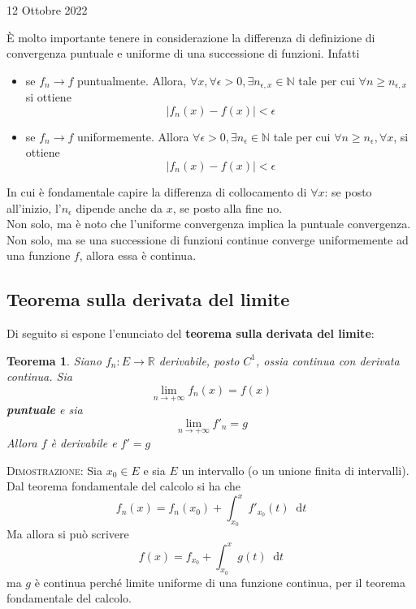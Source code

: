 \documentclass[a4paper]{extarticle}
\newtheorem{theorem}{Teorema}[section]
\newcommand*\dif{\mathop{}\!\mathrm{d}}
\begin{document}
\newpage
\noindent
\begin{center}
    12 Ottobre 2022
\end{center}
È molto importante tenere in considerazione la differenza di definizione di convergenza puntuale e uniforme di una successione di funzioni. Infatti
\begin{itemize}
    \item se $f_n \to f$ puntualmente. Allora, $\forall x, \forall \epsilon > 0, \exists n_{\epsilon,x} \in \mathbb{N}$ tale per cui $\forall n \geq n_{\epsilon,x}$ si ottiene
    \[\left \vert f_n(x) - f(x) \right \vert < \epsilon\]

    \item se $f_n \to f$ uniformemente. Allora $\forall \epsilon > 0, \exists n_\epsilon \in \mathbb{N}$ tale per cui $\forall n \geq n_\epsilon, \forall x$, si ottiene
    \[\left \vert f_n(x) - f(x) \right \vert < \epsilon\]
\end{itemize}
In cui è fondamentale capire la differenza di collocamento di $\forall x$: se posto all'inizio, l'$n_\epsilon$ dipende anche da $x$, se posto alla fine no.\\
Non solo, ma è noto che l'uniforme convergenza implica la puntuale convergenza. Non solo, ma se una successione di funzioni continue converge uniformemente ad una funzione $f$, allora essa è continua.

\vspace{1em}
\subsection{Teorema sulla derivata del limite}
Di seguito si espone l'enunciato del \textbf{teorema sulla derivata del limite}:

\begin{theorem}
    Siano $f_n : E \to \mathbb{R}$ derivabile, posto $C^1$, ossia continua con derivata continua. Sia
    \[\lim_{n \to +\infty} f_n(x) = f(x)\]
    \textbf{puntuale} e sia
    \[\lim_{n \to +\infty} f'_n = g\]
    Allora $f$ è derivabile e $f'=g$
\end{theorem}

\vspace{2em}
\noindent
\normalfont \normalsize
\textsc{Dimostrazione}: Sia $x_0 \in E$ e sia $E$ un intervallo (o un unione finita di intervalli). Dal teorema fondamentale del calcolo si ha che
\[f_n(x) = f_n(x_0) + \int_{x_0}^x f'_{x_0}(t) \dif t\]
Ma allora si può scrivere
\[f(x) = f_{x_0} + \int_{x_0}^x g(t) \dif t\]
ma $g$ è continua perché limite uniforme di una funzione continua, per il teorema fondamentale del calcolo.
\end{document}
